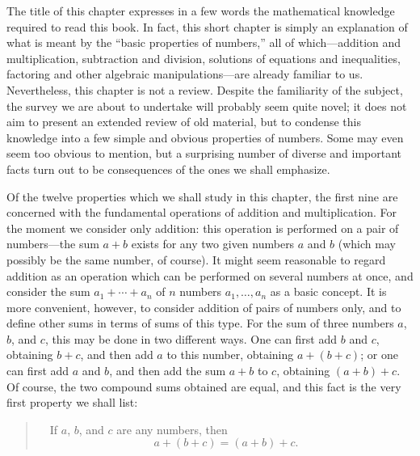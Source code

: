 

The title of this chapter expresses in a few words the mathematical knowledge
required to read this book. In fact, this short chapter is simply an
explanation of what is meant by the ``basic properties of numbers,'' all of
which---addition and multiplication, subtraction and division, solutions of
equations and inequalities, factoring and other algebraic manipulations---are
already familiar to us. Nevertheless, this chapter is not a review. Despite
the familiarity of the subject, the survey we are about to undertake will
probably seem quite novel; it does not aim to present an extended review of
old material, but to condense this knowledge into a few simple and obvious
properties of numbers. Some may even seem too obvious to mention, but a
surprising number of diverse and important facts turn out to be consequences
of the ones we shall emphasize.

Of the twelve properties which we shall study in this chapter, the first nine
are concerned with the fundamental operations of addition and multiplication.
For the moment we consider only addition: this operation is performed on a
pair of numbers---the sum $a+b$ exists for any two given numbers $a$ and $b$
(which may possibly be the same number, of course). It might seem reasonable
to regard addition as an operation which can be performed on several numbers
at once, and consider the sum $a_1 + \cdots + a_n$ of $n$ numbers
$a_1, \dots, a_n$ as a basic concept. It is more convenient, however, to
consider addition of pairs of numbers only, and to define other sums in terms
of sums of this type. For the sum of three numbers $a$, $b$, and $c$, this
may be done in two different ways. One can first add $b$ and $c$, obtaining
$b+c$, and then add $a$ to this number, obtaining $a+(b+c)$; or one can first
add $a$ and $b$, and then add the sum $a+b$ to $c$, obtaining $(a+b)+c$. Of
course, the two compound sums obtained are equal, and this fact is the very
first property we shall list:

\begin{quote}
\ \ If $a$, $b$, and $c$ are any numbers, then
\[ a + (b + c) = (a + b) + c. \]
\end{quote}

